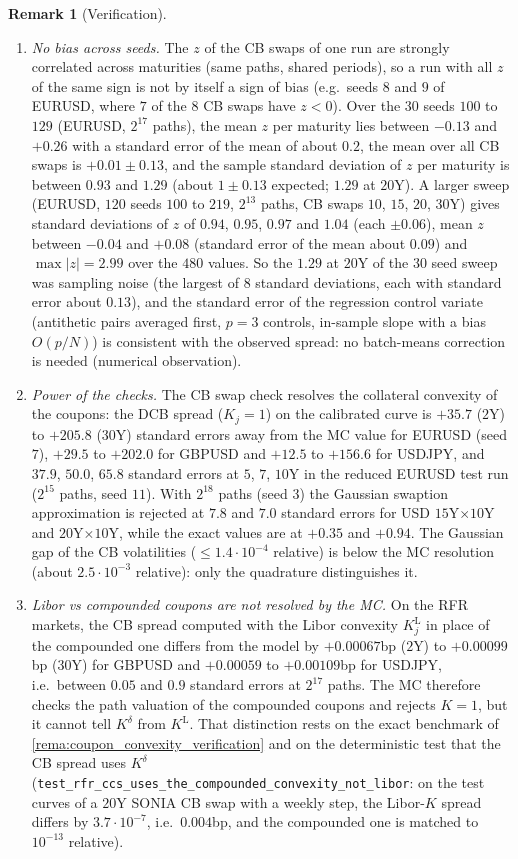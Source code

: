 \documentclass[11pt,english]{amsart}
\theoremstyle{definition}
\newtheorem{rema}{Remark}
\begin{document}
\begin{rema}[Verification]
\begin{enumerate}
\item \emph{No bias across seeds.} The $z$ of the CB swaps of one run are strongly correlated across maturities (same paths, shared periods), so a run with all $z$ of the same sign is not by itself a sign of bias (e.g.\ seeds $8$ and $9$ of EURUSD, where $7$ of the $8$ CB swaps have $z<0$). Over the $30$ seeds $100$ to $129$ (EURUSD, $2^{17}$ paths), the mean $z$ per maturity lies between $-0.13$ and $+0.26$ with a standard error of the mean of about $0.2$, the mean over all CB swaps is $+0.01\pm0.13$, and the sample standard deviation of $z$ per maturity is between $0.93$ and $1.29$ (about $1\pm0.13$ expected; $1.29$ at $20$Y). A larger sweep (EURUSD, $120$ seeds $100$ to $219$, $2^{13}$ paths, CB swaps $10$, $15$, $20$, $30$Y) gives standard deviations of $z$ of $0.94$, $0.95$, $0.97$ and $1.04$ (each $\pm0.06$), mean $z$ between $-0.04$ and $+0.08$ (standard error of the mean about $0.09$) and $\max|z| = 2.99$ over the $480$ values. So the $1.29$ at $20$Y of the $30$ seed sweep was sampling noise (the largest of $8$ standard deviations, each with standard error about $0.13$), and the standard error of the regression control variate (antithetic pairs averaged first, $p = 3$ controls, in-sample slope with a bias $O(p/N)$) is consistent with the observed spread: no batch-means correction is needed (numerical observation).
\item \emph{Power of the checks.} The CB swap check resolves the collateral convexity of the coupons: the DCB spread ($K_j = 1$) on the calibrated curve is $+35.7$ ($2$Y) to $+205.8$ ($30$Y) standard errors away from the MC value for EURUSD (seed $7$), $+29.5$ to $+202.0$ for GBPUSD and $+12.5$ to $+156.6$ for USDJPY, and $37.9$, $50.0$, $65.8$ standard errors at $5$, $7$, $10$Y in the reduced EURUSD test run ($2^{15}$ paths, seed $11$). With $2^{18}$ paths (seed $3$) the Gaussian swaption approximation is rejected at $7.8$ and $7.0$ standard errors for USD $15$Y$\times10$Y and $20$Y$\times10$Y, while the exact values are at $+0.35$ and $+0.94$. The Gaussian gap of the CB volatilities ($\le1.4\cdot10^{-4}$ relative) is below the MC resolution (about $2.5\cdot10^{-3}$ relative): only the quadrature distinguishes it.
\item \emph{Libor vs compounded coupons are not resolved by the MC.} On the RFR markets, the CB spread computed with the Libor convexity $K^{\mathrm{L}}_j$ in place of the compounded one differs from the model by $+0.00067$bp ($2$Y) to $+0.00099$bp ($30$Y) for GBPUSD and $+0.00059$ to $+0.00109$bp for USDJPY, i.e.\ between $0.05$ and $0.9$ standard errors at $2^{17}$ paths. The MC therefore checks the path valuation of the compounded coupons and rejects $K = 1$, but it cannot tell $K^\delta$ from $K^{\mathrm{L}}$. That distinction rests on the exact benchmark of \autoref{rema:coupon_convexity_verification} and on the deterministic test that the CB spread uses $K^\delta$ (\texttt{test\_rfr\_ccs\_uses\_the\_compounded\_convexity\_not\_libor}: on the test curves of a $20$Y SONIA CB swap with a weekly step, the Libor-$K$ spread differs by $3.7\cdot10^{-7}$, i.e.\ $0.004$bp, and the compounded one is matched to $10^{-13}$ relative).

\end{enumerate}
\end{rema}
\end{document}
